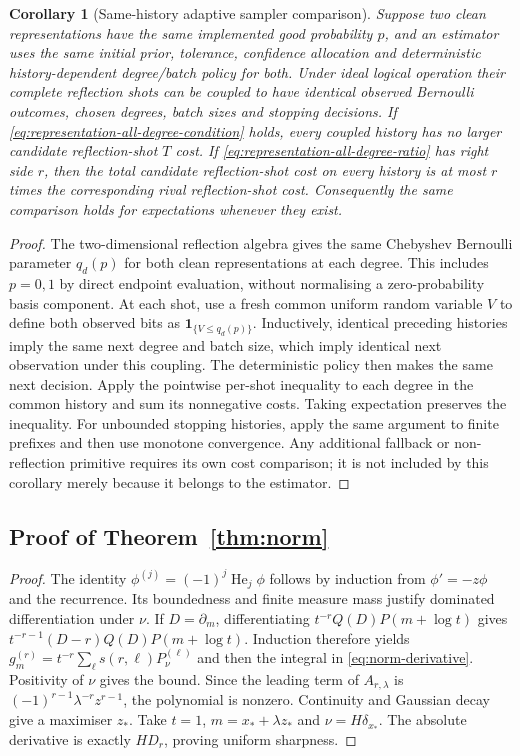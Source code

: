 \documentclass[11pt]{article}
\newtheorem{corollary}[theorem]{Corollary}
\begin{document}
\begin{corollary}[Same-history adaptive sampler comparison]
\label{cor:representation-same-history}
Suppose two clean representations have the same implemented good
probability $p$, and an estimator uses the same initial prior, tolerance,
confidence allocation and deterministic history-dependent degree/batch
policy for both. Under ideal logical operation their complete reflection
shots can be coupled to have identical observed Bernoulli outcomes,
chosen degrees, batch sizes and stopping decisions. If
\eqref{eq:representation-all-degree-condition} holds, every coupled
history has no larger candidate reflection-shot $T$ cost. If
\eqref{eq:representation-all-degree-ratio} has right side $r$, then
the total candidate reflection-shot cost on every history is at most
$r$ times the corresponding rival reflection-shot cost. Consequently
the same comparison holds for expectations whenever they exist.
\end{corollary}
\begin{proof}
The two-dimensional reflection algebra gives the same
Chebyshev Bernoulli parameter $q_d(p)$ for both clean representations
at each degree. This includes $p=0,1$ by direct endpoint evaluation,
without normalising a zero-probability basis component. At each shot,
use a fresh common uniform random variable $V$ to define both observed
bits as $\mathbf1_{\{V\leq q_d(p)\}}$. Inductively, identical preceding
histories imply the same next degree and batch size, which imply
identical next observation under this coupling. The deterministic
policy then makes the same next decision. Apply the pointwise
per-shot inequality to each degree in the common history and sum its
nonnegative costs. Taking expectation preserves the inequality.
For unbounded stopping histories, apply the same argument to finite
prefixes and then use monotone convergence. Any additional fallback
or non-reflection primitive requires its own cost comparison; it is not
included by this corollary merely because it belongs to the estimator.
\end{proof}

\subsection{Proof of Theorem~\ref{thm:norm}}
\label{app:proof-norm}

\begin{proof}
The identity $\phi^{(j)}=(-1)^j\operatorname{He}_j\phi$ follows by
induction from $\phi'=-z\phi$ and the recurrence.  Its boundedness and
finite measure mass justify dominated differentiation under $\nu$.
If $D=\partial_m$, differentiating $t^{-r}Q(D)P(m+\log t)$ gives
$t^{-r-1}(D-r)Q(D)P(m+\log t)$.  Induction therefore yields
$g_m^{(r)}=t^{-r}\sum_\ell s(r,\ell)P_\nu^{(\ell)}$ and then the
integral in \eqref{eq:norm-derivative}.  Positivity of $\nu$ gives the
bound.  Since the leading term of $A_{r,\lambda}$ is
$(-1)^{r-1}\lambda^{-r}z^{r-1}$, the polynomial is nonzero.
Continuity and Gaussian decay give a maximiser $z_*$.  Take
$t=1$, $m=x_*+\lambda z_*$ and $\nu=H\delta_{x_*}$.
The absolute derivative is exactly $HD_r$, proving uniform sharpness.
\end{proof}
\end{document}
